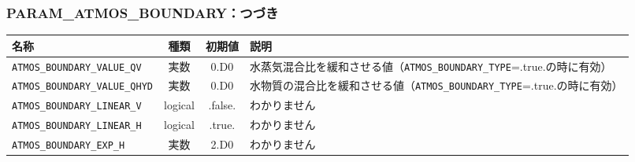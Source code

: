 \subsubsection{PARAM\_ATMOS\_BOUNDARY：つづき}
\begin{tabularx}{150mm}{|l|c|c|X|} \hline
 \rowcolor[gray]{0.9} 名称 & 種類 & 初期値 & 説明 \\ \hline
 \verb|ATMOS_BOUNDARY_VALUE_QV| & 実数 & 0.D0 & 水蒸気混合比を緩和させる値（\verb|ATMOS_BOUNDARY_TYPE|=.true.の時に有効） \\ \hline
 \verb|ATMOS_BOUNDARY_VALUE_QHYD| & 実数 & 0.D0 & 水物質の混合比を緩和させる値（\verb|ATMOS_BOUNDARY_TYPE|=.true.の時に有効） \\ \hline
 \verb|ATMOS_BOUNDARY_LINEAR_V| & logical & .false. &  わかりません\\ \hline
 \verb|ATMOS_BOUNDARY_LINEAR_H| & logical & .true.  &  わかりません\\ \hline
 \verb|ATMOS_BOUNDARY_EXP_H| & 実数 & 2.D0 & わかりません \\ \hline
\end{tabularx}


